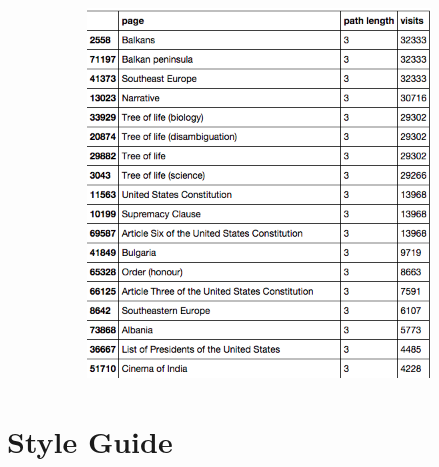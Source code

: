 \documentclass[twoside]{article}
\begin{document}
\begin{figure}[H]
\centering
\caption{highest ranking 3-Cycles}
    \begin{subfigure}[b]{0.8\textwidth}
        \includegraphics[width=\textwidth]{graphics/top_3loops.png}
    \end{subfigure}
\end{figure}
\newpage
\section*{Style Guide}
\end{document}
